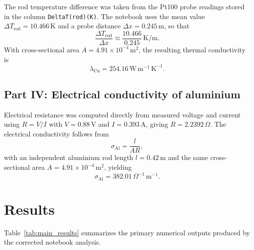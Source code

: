 \documentclass[journal]{IEEEtran}
\begin{document}
The rod temperature difference was taken from the Pt100 probe readings stored in the
column \texttt{DeltaT(rod)(K)}. The notebook uses the mean value
$\overline{\Delta T_{\text{rod}}}=10.466\,\text{K}$ and a probe distance
$\Delta x = 0.245\,\text{m}$, so that
\begin{equation}
    \frac{\Delta T_{\text{rod}}}{\Delta x} \approx \frac{10.466}{0.245}\,\text{K/m}.
\end{equation}
With cross-sectional area $A = 4.91\times 10^{-4}\,\text{m}^2$, the resulting thermal
conductivity is
\begin{equation}
    \lambda_{\text{Cu}} = 254.16\,\text{W}\,\text{m}^{-1}\,\text{K}^{-1}.
\end{equation}

\subsection{Part IV: Electrical conductivity of aluminium}
Electrical resistance was computed directly from measured voltage and current using
$R=V/I$ with $V=0.88\,\text{V}$ and $I=0.393\,\text{A}$, giving
$R=2.2392\,\Omega$. The electrical conductivity follows from
\begin{equation}
    \sigma_{\text{Al}} = \frac{l}{A R},
\end{equation}
with an independent aluminium rod length $l=0.42\,\text{m}$ and the same cross-sectional
area $A=4.91\times 10^{-4}\,\text{m}^2$, yielding
\begin{equation}
    \sigma_{\text{Al}} = 382.01\,\Omega^{-1}\,\text{m}^{-1}.
\end{equation}

\section{Results}
Table~\ref{tab:main_results} summarizes the primary numerical outputs produced by the corrected
notebook analysis.
\end{document}
